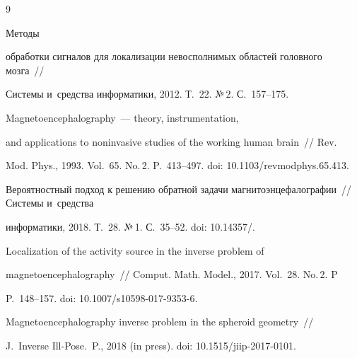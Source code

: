 {\small\frenchspacing


{%




\begin{thebibliography}{9}




     Методы 


обработки сигналов для локализации невосполнимых областей головного мозга~/\!\!/ 


Системы и~средства информатики, 2012. Т.~22. №\,2. С.~157--175.






    Magnetoencephalography~--- theory, instrumentation, 


and applications to noninvasive studies of the working human brain~/\!\!/ Rev. 


Mod. Phys., 1993. Vol.~65. No.\,2. P.~413--497. doi: 10.1103\!/\!revmodphys.65.413.






Вероятностный подход к решению обратной задачи магнитоэнцефалографии~/\!\!/ Системы и~средства 


информатики, 2018. Т.~28. №\,1. С.~35--52. doi: 10.14357\!/.






    Localization of the activity source in the inverse problem of 


magnetoencephalography~/\!\!/ Comput. Math. Model., 2017.  Vol.~28. No.\,2.  P


P.~148--157. doi: 10.1007\!/\!s10598-017-9353-6.






Magnetoencephalography inverse problem in the spheroid geometry~/\!\!/ 


J.~Inverse Ill-Pose.~P., 2018 (in press). doi: 10.1515\!/\!jiip-2017-0101.



\end{thebibliography}}}

